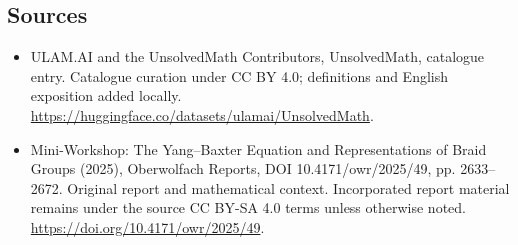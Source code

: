 \documentclass[11pt]{article}
\begin{document}
\subsection{Sources}
\begin{itemize}
\item[\hypertarget{source:statement:1}{S1}] ULAM.AI and the UnsolvedMath Contributors, UnsolvedMath, catalogue entry. Catalogue curation under CC BY 4.0; definitions and English exposition added locally.
\url{https://huggingface.co/datasets/ulamai/UnsolvedMath}.
\item[\hypertarget{source:statement:2}{S2}] Mini-Workshop: The Yang–Baxter Equation and Representations of Braid Groups (2025), Oberwolfach Reports, DOI 10.4171/owr/2025/49, pp. 2633--2672. Original report and mathematical context. Incorporated report material remains under the source CC BY-SA 4.0 terms unless otherwise noted.
\url{https://doi.org/10.4171/owr/2025/49}.
\end{itemize}
\label{end:statement}
\end{document}
